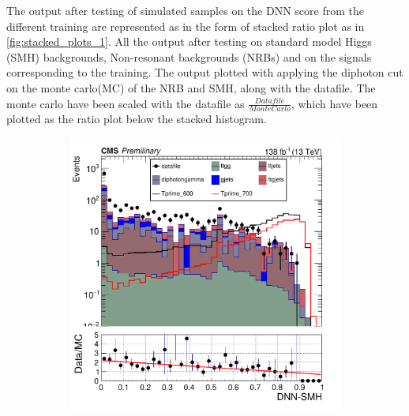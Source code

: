 The output after testing of simulated samples on the DNN score from the different training are represented as in the form of stacked ratio plot as in \autoref{fig:stacked_plots_1}. All the output  after testing on standard model Higgs (SMH) backgrounds, Non-resonant backgrounds (NRBs) and on the signals corresponding to the training. The output plotted with applying the diphoton cut on  the monte carlo(MC) of the NRB and SMH, along with the datafile. The monte carlo have been scaled with the datafile as $\frac{Datafile}{MonteCarlo}$, which have been plotted as the ratio plot below the stacked histogram.\\

\begin{figure}[H]
     \centering
     \begin{subfigure}[b]{0.3\textwidth}
         \centering
         \includegraphics[width=\textwidth, scale = 0.5]{figure_4/Stacked_plot_DNN_600-700_with_diphoton_cuts.pdf}
     \end{subfigure}
     \hfill
     \begin{subfigure}[b]{0.3\textwidth}
         \centering

\end{subfigure}
\end{figure}
